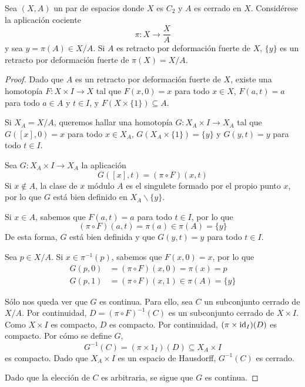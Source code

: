 \begin{lemma}\label{RetrCoci}
Sea $(X,A)$ un par de espacios donde $X$ es $C_2$ y $A$ es cerrado en $X$.
Considérese la aplicación cociente
\[\pi\colon X \to \frac{X}{A}\]
y sea $y=\pi(A) \in X/A$. Si $A$ es retracto por deformación fuerte de $X$,
$\{y\}$ es un retracto por deformación fuerte de $\pi(X)=X/A$.
\end{lemma}

\begin{proof}
Dado que $A$ es un retracto por deformación fuerte de $X$, existe una
homotopía $F\colon X \times I \to X$ tal que $F(x,0)=x$ para todo $x \in X$,
$F(a,t)=a$ para todo $a \in A$ y $t \in I$, y $F(X\times\{1\}) \subseteq A$.

Si $X_A=X/A$, queremos hallar una homotopía $G\colon X_A\times I \to X_A$ tal
que $G([x],0)=x$ para todo $x \in X_A$, $G(X_A\times\{1\})=\{y\}$ y $G(y,t)=y$
para todo $t \in I$.

Sea $G\colon X_A\times I \longrightarrow X_A$ la aplicación
\[G([x],t)=(\pi\circ F)(x,t)\]
Si $x \not\in A$, la clase de $x$ módulo $A$ es el singulete formado por el
propio punto $x$, por lo que $G$ está bien definido en $X_A\backslash\{y\}$.

Si $x \in A$, sabemos que $F(a,t)=a$ para todo $t \in I$, por lo que
\[(\pi\circ F)(a,t)=\pi(a) \in \pi(A)=\{y\}\]
De esta forma, $G$ está bien definida y que $G(y,t)=y$ para todo $t \in I$.

Sea $p \in X/A$. Si $x \in \pi^{-1}(p)$, sabemos que $F(x,0)=x$, por lo que
\begin{align*}
G(p,0)&=(\pi\circ F)(x,0)=\pi(x)=p\\
G(p,1)&=(\pi \circ F)(x,1)\in \pi(A)=\{y\}
\end{align*}

Sólo nos queda ver que $G$ es continua. Para ello, sea $C$ un subconjunto
cerrado de $X/A$. Por continuidad, $D=(\pi\circ F)^{-1}(C)$ es un subconjunto
cerrado de $X\times I$. Como $X\times I$ es compacto, $D$ es compacto. Por
continuidad, $(\pi\times \operatorname{id}_I)(D)$ es compacto. Por cómo se define $G$,
\[G^{-1}(C)=(\pi\times 1_I)(D) \subseteq X_A \times I\]
es compacto. Dado que
$X_A\times I$ es un espacio de Hausdorff, $G^{-1}(C)$ es cerrado.

Dado que la elección de $C$ es arbitraria, se sigue que $G$ es continua.
\end{proof}

